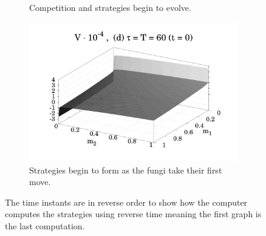 \documentclass[11pt]{amsart}
\begin{document}
\begin{figure}
\begin{subfigure}{.48 \textwidth}
        \caption{Competition and strategies begin to evolve.}
        \label{fig_4_c}
    \end{subfigure}
    \hfill
    \begin{subfigure}{.48 \textwidth}
        \includegraphics[width = \textwidth]{figures/Figure_4d_1.pdf}
        \caption{Strategies begin to form as the fungi take their first move.}
        \label{fig_4_d}
    \end{subfigure}

\bf \caption{The time instants are in reverse order to show how the computer computes the strategies using reverse time meaning the first graph is the last computation.}
\label{Fig_4}
\end{figure}
\end{document}

